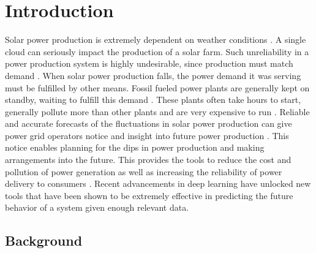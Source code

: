 \chapter{Introduction\label{cha:introduction}}

Solar power production is extremely dependent on weather conditions \cite{lin_temporal_2020, lee_forecasting_2018, jaidee_very_2019, su_machine_2019, jang_solar_2016}. A single cloud can seriously impact the production of a solar farm. Such unreliability in a power production system is highly undesirable, since production must match demand \cite{lee_forecasting_2018}. When solar power production falls, the power demand it was serving must be fulfilled by other means. Fossil fueled power plants are generally kept on standby, waiting to fulfill this demand \cite{lee_forecasting_2018}. These plants often take hours to start, generally pollute more than other plants and are very expensive to run \cite{lee_forecasting_2018}.
Reliable and accurate forecasts of the fluctuations in solar power production can give power grid operators notice and insight into future power production \cite{lee_forecasting_2018}. This notice enables planning for the dips in power production and making arrangements into the future. This provides the tools to reduce the cost and pollution of power generation as well as increasing the reliability of power delivery to consumers \cite{lee_forecasting_2018}.
Recent advancements in deep learning have unlocked new tools that have been shown to be extremely effective in predicting the future behavior of a system given enough relevant data.\\


\section{Background}


